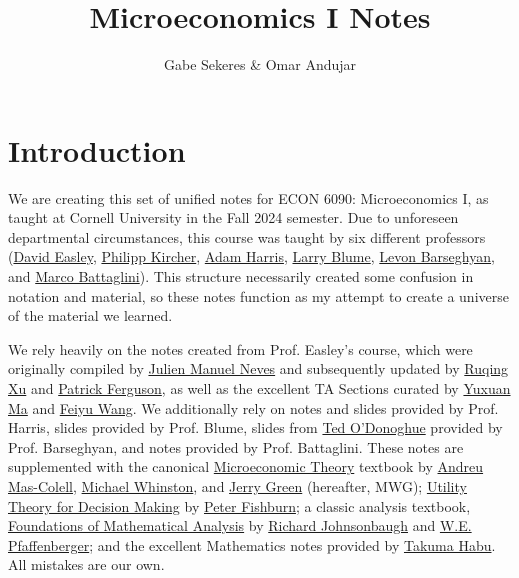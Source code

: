 \documentclass[12pt]{article}
\title{Microeconomics I Notes}
\author{Gabe Sekeres \& Omar Andujar}
\begin{document}
\maketitle

\section*{Introduction}

We are creating this set of unified notes for ECON 6090: Microeconomics I, as taught at Cornell University in the Fall 2024 semester. Due to unforeseen departmental circumstances, this course was taught by six different professors (\href{https://easley.economics.cornell.edu/}{David Easley}, \href{https://philippkircher.com/}{Philipp Kircher}, \href{https://adamharris.phd/}{Adam Harris}, \href{https://sites.santafe.edu/~leb/}{Larry Blume}, \href{https://barseghyan.economics.cornell.edu/}{Levon Barseghyan}, and \href{https://www.mbattaglini.com/}{Marco Battaglini}). This structure necessarily created some confusion in notation and material, so these notes function as my attempt to create a universe of the material we learned.

We rely heavily on the notes created from Prof. Easley's course, which were originally compiled by \href{https://julienneves.com/}{Julien Manuel Neves} and subsequently updated by \href{https://ruqing-xu.github.io/}{Ruqing Xu} and \href{https://economics.cornell.edu/patrick-ferguson}{Patrick Ferguson}, as well as the excellent TA Sections curated by \href{https://economics.cornell.edu/yuxuan-ma}{Yuxuan Ma} and \href{https://dyson.cornell.edu/programs/graduate/graduate-student-directory/}{Feiyu Wang}. We additionally rely on notes and slides provided by Prof. Harris, slides provided by Prof. Blume, slides from \href{https://blogs.cornell.edu/odonoghue/}{Ted O'Donoghue} provided by Prof. Barseghyan, and notes provided by Prof. Battaglini. These notes are supplemented with the canonical \href{https://global.oup.com/academic/product/microeconomic-theory-9780195073409?cc=us&lang=en&}{Microeconomic Theory} textbook by \href{https://www.upf.edu/web/andreu-mas-colell}{Andreu Mas-Colell}, \href{https://mitsloan.mit.edu/faculty/directory/michael-whinston}{Michael Whinston}, and \href{https://www.hbs.edu/faculty/Pages/profile.aspx?facId=6466}{Jerry Green} (hereafter, MWG); \href{https://www.semanticscholar.org/paper/Utility-theory-for-decision-making-Fishburn/905a24a912171436e0abd3b5f1fdcb963e6f852f}{Utility Theory for Decision Making} by \href{https://en.wikipedia.org/wiki/Peter_C._Fishburn}{Peter Fishburn}; a classic analysis textbook, \href{https://store.doverpublications.com/products/9780486477664}{Foundations of Mathematical Analysis} by \href{https://condor.depaul.edu/~rjohnson/}{Richard Johnsonbaugh} and \href{https://www.mathgenealogy.org/id.php?id=12494}{W.E. Pfaffenberger}; and the excellent Mathematics notes provided by \href{https://www.takumahabu.com/Economics}{Takuma Habu}. All mistakes are our own.
\end{document}
